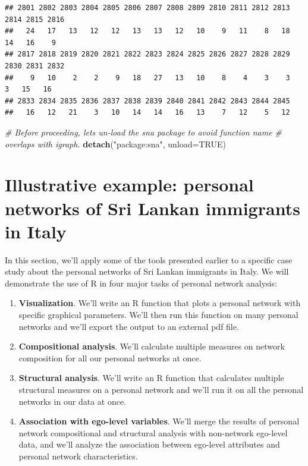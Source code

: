 \documentclass[
]{book}
\newenvironment{Shaded}{\begin{snugshade}}{\end{snugshade}}
\newcommand{\AttributeTok}[1]{\textcolor[rgb]{0.13,0.29,0.53}{#1}}
\newcommand{\CommentTok}[1]{\textcolor[rgb]{0.56,0.35,0.01}{\textit{#1}}}
\newcommand{\ConstantTok}[1]{\textcolor[rgb]{0.56,0.35,0.01}{#1}}
\newcommand{\FunctionTok}[1]{\textcolor[rgb]{0.13,0.29,0.53}{\textbf{#1}}}
\newcommand{\NormalTok}[1]{#1}
\newcommand{\StringTok}[1]{\textcolor[rgb]{0.31,0.60,0.02}{#1}}
\begin{document}
\begin{verbatim}
## 2801 2802 2803 2804 2805 2806 2807 2808 2809 2810 2811 2812 2813 2814 2815 2816 
##   24   17   13   12   12   13   13   12   10    9   11    8   18   14   16    9 
## 2817 2818 2819 2820 2821 2822 2823 2824 2825 2826 2827 2828 2829 2830 2831 2832 
##    9   10    2    2    9   18   27   13   10    8    4    3    3    3   15   16 
## 2833 2834 2835 2836 2837 2838 2839 2840 2841 2842 2843 2844 2845 
##   16   12   21    3   10   14   14   16   13    7   12    5   12
\end{verbatim}

\begin{Shaded}
\begin{Highlighting}[]
\CommentTok{\# Before proceeding, let\textquotesingle{}s un{-}load the sna package to avoid function name }
\CommentTok{\# overlaps with igraph.}
\FunctionTok{detach}\NormalTok{(}\StringTok{"package:sna"}\NormalTok{, }\AttributeTok{unload=}\ConstantTok{TRUE}\NormalTok{)}
\end{Highlighting}
\end{Shaded}

\hypertarget{illustrative-example-personal-networks-of-sri-lankan-immigrants-in-italy}{%
\section{Illustrative example: personal networks of Sri Lankan immigrants in Italy}\label{illustrative-example-personal-networks-of-sri-lankan-immigrants-in-italy}}

In this section, we'll apply some of the tools presented earlier to a specific case study about the personal networks of Sri Lankan immigrants in Italy. We will demonstrate the use of R in four major tasks of personal network analysis:

\begin{enumerate}
\def\labelenumi{\arabic{enumi}.}
\item
  \textbf{Visualization}. We'll write an R function that plots a personal network with specific graphical parameters. We'll then run this function on many personal networks and we'll export the output to an external pdf file.
\item
  \textbf{Compositional analysis}. We'll calculate multiple measures on network composition for all our personal networks at once.
\item
  \textbf{Structural analysis}. We'll write an R function that calculates multiple structural measures on a personal network and we'll run it on all the personal networks in our data at once.
\item
  \textbf{Association with ego-level variables}. We'll merge the results of personal network compositional and structural analysis with non-network ego-level data, and we'll analyze the association between ego-level attributes and personal network characteristics.
\end{enumerate}
\end{document}
